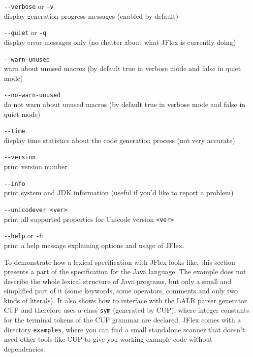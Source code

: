 \texttt{-\/-verbose} or \texttt{-v}\\display generation progress
messages (enabled by default)

\texttt{-\/-quiet} or \texttt{-q}\\display error messages only (no
chatter about what JFlex is currently doing)

\texttt{-\/-warn-unused}\\warn about unused macros (by default true in
verbose mode and false in quiet mode)

\texttt{-\/-no-warn-unused}\\do not warn about unused macros (by default
true in verbose mode and false in quiet mode)

\texttt{-\/-time}\\display time statistics about the code generation
process (not very accurate)

\texttt{-\/-version}\\print version number

\texttt{-\/-info}\\print system and JDK information (useful if you'd
like to report a problem)

\texttt{-\/-unicodever\ \textless{}ver\textgreater{}}\\print all
supported properties for Unicode version
\texttt{\textless{}ver\textgreater{}}

\texttt{-\/-help} or \texttt{-h}\\print a help message explaining
options and usage of JFlex.


To demonstrate how a lexical specification with JFlex looks like, this
section presents a part of the specification for the Java language. The
example does not describe the whole lexical structure of Java programs,
but only a small and simplified part of it (some keywords, some
operators, comments and only two kinds of literals). It also shows how
to interface with the LALR parser generator CUP \autocite{CUP} and
therefore uses a class \texttt{sym} (generated by CUP), where integer
constants for the terminal tokens of the CUP grammar are declared. JFlex
comes with a directory \texttt{examples}, where you can find a small
standalone scanner that doesn't need other tools like CUP to give you
working example code without dependencies.

